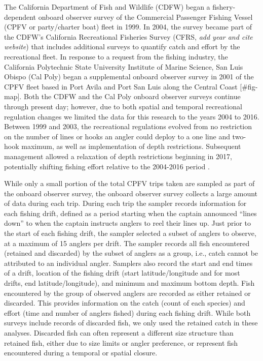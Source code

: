 \documentclass[
  12pt,
  authoryear,
  preprint,
  3p]{elsarticle}
\begin{document}
The California Department of Fish and Wildlife (CDFW) began a
fishery-dependent onboard observer survey of the Commercial Passenger
Fishing Vessel (CPFV or party/charter boat) fleet in 1999. In 2004, the
survey became part of the CDFW's California Recreational Fisheries
Survey (CFRS, \emph{add year and cite website}) that includes additional
surveys to quantify catch and effort by the recreational fleet. In
response to a request from the fishing industry, the California
Polytechnic State University Institute of Marine Science, San Luis
Obispo (Cal Poly) began a supplemental onboard observer survey in 2001
of the CPFV fleet based in Port Avila and Port San Luis along the
Central Coast {[}\#fig-map{]}. Both the CDFW and the Cal Poly onboard
observer surveys continue through present day; however, due to both
spatial and temporal recreational regulation changes we limited the data
for this research to the years 2004 to 2016. Between 1999 and 2003, the
recreational regulations evolved from no restriction on the number of
lines or hooks an angler could deploy to a one line and two-hook
maximum, as well as implementation of depth restrictions. Subsequent
management allowed a relaxation of depth restrictions beginning in 2017,
potentially shifting fishing effort relative to the 2004-2016 period
\citep{Monk:2021:SVR}.

While only a small portion of the total CPFV trips taken are sampled as
part of the onboard observer survey, the onboard observer survey
collects a large amount of data during each trip. During each trip the
sampler records information for each fishing drift, defined as a period
starting when the captain announced ``lines down'' to when the captain
instructs anglers to reel their lines up. Just prior to the start of
each fishing drift, the sampler selected a subset of anglers to observe,
at a maximum of 15 anglers per drift. The sampler records all fish
encountered (retained and discarded) by the subset of anglers as a
group, i.e., catch cannot be attributed to an individual angler.
Samplers also record the start and end times of a drift, location of the
fishing drift (start latitude/longitude and for most drifts, end
latitude/longitude), and minimum and maximum bottom depth. Fish
encountered by the group of observed anglers are recorded as either
retained or discarded. This provides information on the catch (count of
each species) and effort (time and number of anglers fished) during each
fishing drift. While both surveys include records of discarded fish, we
only used the retained catch in these analyses. Discarded fish can often
represent a different size structure than retained fish, either due to
size limits or angler preference, or represent fish encountered during a
temporal or spatial closure.
\end{document}
